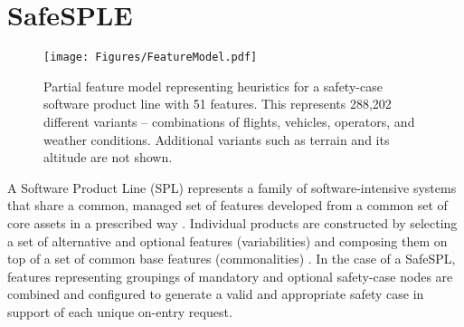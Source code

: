 \section{SafeSPLE}
\label{sec:SafeSPLE}

\begin{figure}[ht]
\centering
\texttt{[image: Figures/FeatureModel.pdf]}
\caption{Partial feature model representing heuristics for a safety-case software product line with 51 features. This represents 288,202 different variants -- combinations of flights, vehicles, operators, and weather conditions. Additional variants such as terrain and its altitude are not  shown.}\label{fig:featuremodel}
\end{figure}

A Software Product Line (SPL) represents a family of software-intensive systems that share a common, managed set of features developed from a common set of core assets in a prescribed way \cite{Clements2001, weiss1999software, Pohl-PL-Eng-Book, Kang1990, SEI-PL}. Individual products are constructed by selecting a set of alternative and optional features (variabilities) and composing them on top of a set of common base features (commonalities) \cite{DonBatory-FeatureDef, pl-feature-modeling-kang, DBLP:books/daglib/0087788, Gomaa, Fantechi-Gnesi}. In the case of a SafeSPL, features representing groupings of mandatory and optional safety-case nodes are combined and configured to generate a valid and appropriate safety case in support of each unique on-entry request. 

